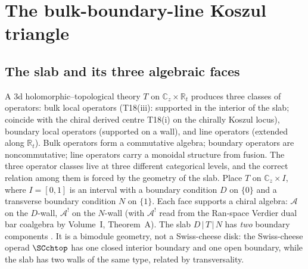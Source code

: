 \label{chap:ht-bulk-boundary-line}

\providecommand{\kk}{\mathbb{k}}
\providecommand{\SCop}{\mathsf{SC}^{\mathrm{ch,top}}}
\providecommand{\cJ}{\mathcal J}
\providecommand{\cL}{\mathcal L}
\providecommand{\PV}{\operatorname{PV}}
\providecommand{\ot}{\otimes}
\providecommand{\BBar}{\operatorname{Bar}}
\providecommand{\Cobar}{\operatorname{\Omega}}
\providecommand{\Spf}{\operatorname{Spf}}
\providecommand{\mc}{\operatorname{MC}}
\providecommand{\op}{\mathrm{op}}
\providecommand{\der}{\mathrm{der}}
\providecommand{\Kline}{K_{\mathrm{line}}}
\providecommand{\intr}{\mathrm{intr}}
\providecommand{\free}{\mathrm{free}}
\providecommand{\eff}{\mathrm{eff}}
\providecommand{\st}{\mathrm{st}}
\providecommand{\ex}{\mathrm{ex}}
\providecommand{\minmod}{\mathrm{min}}
\providecommand{\expmod}{\mathrm{exp}}
\providecommand{\hkR}{\mathrm{HKR}}
\providecommand{\sn}{\mathrm{SN}}
\providecommand{\hSym}{\widehat{\Sym}}
\providecommand{\cA}{\mathcal{A}}
\providecommand{\Mbar}{\overline{\mathcal{M}}}
\providecommand{\cZ}{\mathcal{Z}}
\providecommand{\cW}{\mathcal{W}}
\providecommand{\gAmod}{\mathfrak{g}^{\mathrm{mod}}_\cA}
\providecommand{\MC}{\operatorname{MC}}
\providecommand{\Conv}{\operatorname{Conv}}
\providecommand{\Tr}{\operatorname{Tr}}


\section{The bulk-boundary-line Koszul triangle}
\label{sec:ht-bulk-boundary-line}

\subsection{The slab and its three algebraic faces}

A 3d holomorphic--topological theory $T$ on $\mathbb{C}_z \times \mathbb{R}_t$
produces three classes of operators: bulk local operators
(T18(iii): supported in the interior of the slab; coincide with
the chiral derived centre T18(i) on the chirally Koszul locus),
boundary local operators (supported on a wall), and line operators
(extended along $\mathbb{R}_t$). Bulk operators form a commutative
algebra; boundary operators are noncommutative; line operators carry
a monoidal structure from fusion. The three operator classes live at
three different categorical levels, and the correct relation among
them is forced by the geometry of the slab. Place $T$ on
$\mathbb{C}_z \times I$, where $I = [0,1]$ is an interval with
a boundary condition $D$ on $\{0\}$ and a transverse boundary
condition $N$ on $\{1\}$. Each face supports a chiral algebra:
$\cA$ on the $D$-wall, $\cA^!$ on the $N$-wall
(with $\cA^!$ read from the Ran-space Verdier dual bar coalgebra by
Volume~I, Theorem~A).
The slab $D \,|\, T \,|\, N$ has \emph{two} boundary
components \cite{Dimofte25}. It is a bimodule geometry, not a
Swiss-cheese disk: the Swiss-cheese operad $\SCchtop$ has one
closed interior boundary and one open boundary, while the slab
has two walls of the same type, related by transversality.

